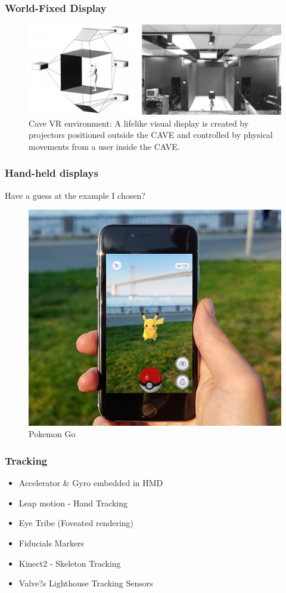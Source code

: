 \begin{frame}
	\frametitle{World-Fixed Display}
	\begin{figure}
		\includegraphics[scale=0.3]{assets/cave.jpg}
		\caption{Cave VR environment: A lifelike visual display is created by projectors positioned outside the CAVE and controlled by physical movements from a user inside the CAVE.}
	\end{figure}
\end{frame}

\begin{frame}
	\frametitle{Hand-held displays}
	Have a guess at the example I chosen?
	\pause
	\begin{figure}
		\includegraphics[scale=0.25]{assets/pgo.png}
		\caption{Pokemon Go}
	\end{figure}
	
\end{frame}

\begin{frame}
	\frametitle{Tracking}
	\begin{itemize}
		\item Accelerator \& Gyro embedded in HMD
		\item Leap motion - Hand Tracking
		\item Eye Tribe (Foveated rendering)
		\item Fiducials Markers
		\item Kinect2 - Skeleton Tracking
		\item Valve?s Lighthouse Tracking Sensors
	\end{itemize}
\end{frame}

